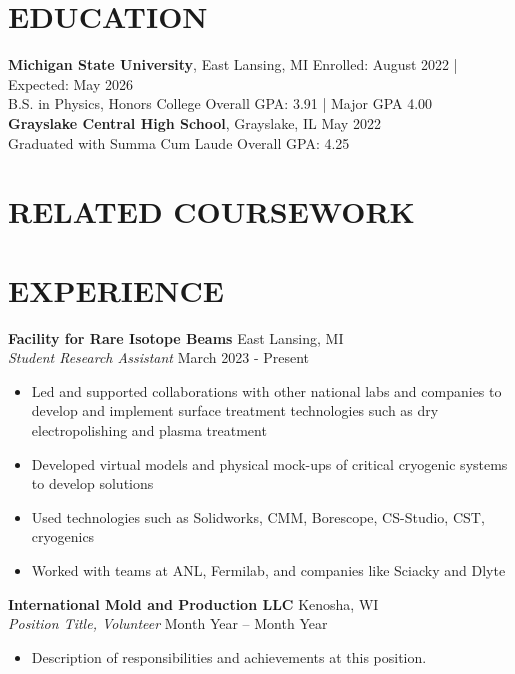 \documentclass[9pt]{developercv} %
\begin{document}
\section*{EDUCATION}
\noindent
\textbf{Michigan State University}, East Lansing, MI \hfill Enrolled: August 2022 | Expected: May 2026\\ %
B.S. in Physics, Honors College \hfill Overall GPA: 3.91 | Major GPA 4.00\\ %

\textbf{Grayslake Central High School}, Grayslake, IL \hfill May 2022\\ 
Graduated with Summa Cum Laude \hfill Overall GPA: 4.25

\section*{RELATED COURSEWORK}

\section*{EXPERIENCE}
\noindent
\textbf{Facility for Rare Isotope Beams} \hfill East Lansing, MI\\ %
\textit{Student Research Assistant} \hfill March 2023 - Present %
\begin{itemize}
    \item Led and supported collaborations with other national labs and companies to develop and implement surface treatment technologies such as dry electropolishing and plasma treatment
    \item Developed virtual models and physical mock-ups of critical cryogenic systems to develop solutions
    \item Used technologies such as Solidworks, CMM, Borescope, CS-Studio, CST, cryogenics
    \item Worked with teams at ANL, Fermilab, and companies like Sciacky and Dlyte
\end{itemize}

\noindent
\textbf{International Mold and Production LLC} \hfill Kenosha, WI\\ %
\textit{Position Title, Volunteer} \hfill Month Year – Month Year %
\begin{itemize}
    \item Description of responsibilities and achievements at this position. %
\end{itemize}
\end{document}
